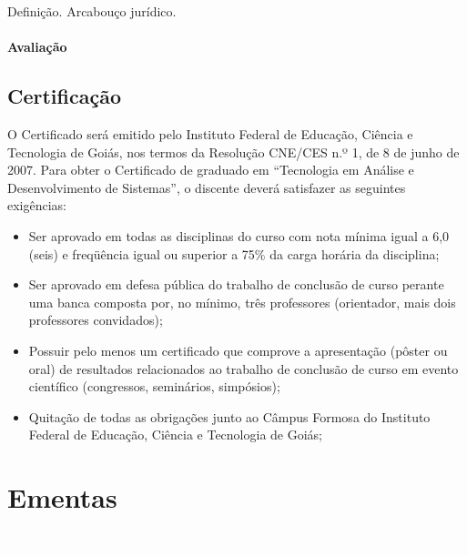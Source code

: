 \documentclass[11pt,fleqn]{book} %
\begin{document}
Definição. Arcabouço jurídico.


\subsubsection{Avaliação}


\section{Certificação}

O Certificado será emitido pelo Instituto Federal de Educação, Ciência e Tecnologia de Goiás, nos termos da Resolução CNE/CES n.º 1, de 8 de junho de 2007.	
Para obter o Certificado de graduado em ``Tecnologia em Análise e Desenvolvimento de Sistemas'', o discente deverá satisfazer as seguintes exigências:
\begin{itemize}
	\item Ser aprovado em todas as disciplinas do curso com nota mínima igual a 6,0 (seis) e freqüência igual ou superior a 75\% da carga horária da disciplina;
	\item Ser aprovado em defesa pública do trabalho de conclusão de curso perante uma banca composta por, no mínimo, três professores (orientador, mais dois professores convidados);
	\item Possuir pelo menos um certificado que comprove a apresentação (pôster ou oral) de resultados relacionados ao trabalho de conclusão de curso em evento científico (congressos, seminários, simpósios);
	\item Quitação de todas as obrigações junto ao Câmpus Formosa do Instituto Federal de Educação, Ciência e Tecnologia de Goiás;
\end{itemize}

\chapter{Ementas}\label{ementas}
\vspace{6em}
\begin{flushright}
	\textit{\textcolor{white}{Um bonita citação...}}
\end{flushright}
\vspace{12em}
\end{document}
